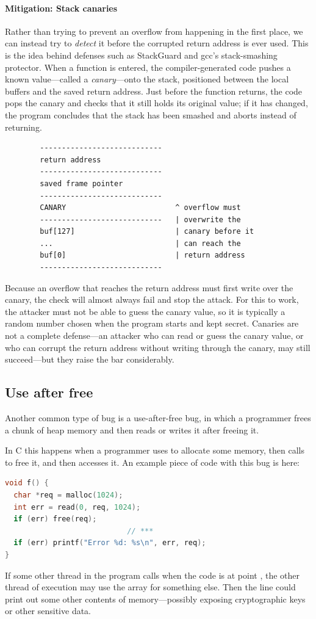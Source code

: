 \paragraph{Mitigation: Stack canaries}
Rather than trying to prevent an overflow from happening in the first
place, we can instead try to \emph{detect} it before the corrupted
return address is ever used. This is the idea behind defenses such as
StackGuard and gcc's stack-smashing protector. When a function is
entered, the compiler-generated code pushes a known value---called a
\emph{canary}---onto the stack, positioned between the local buffers and
the saved return address. Just before the function returns, the code
pops the canary and checks that it still holds its original value; if it
has changed, the program concludes that the stack has been smashed and
aborts instead of returning.
\begin{verbatim}
        ----------------------------
        return address
        ----------------------------
        saved frame pointer
        ----------------------------
        CANARY                         ^ overflow must
        ----------------------------   | overwrite the
        buf[127]                       | canary before it
        ...                            | can reach the
        buf[0]                         | return address
        ----------------------------
\end{verbatim}
Because an overflow that reaches the return address must first write over
the canary, the check will almost always fail and stop the attack. For
this to work, the attacker must not be able to guess the canary value, so
it is typically a random number chosen when the program starts and kept
secret. Canaries are not a complete defense---an attacker who can read or
guess the canary value, or who can corrupt the return address without
writing through the canary, may still succeed---but they raise the bar
considerably.

\subsection{Use after free}
Another common type of bug is a use-after-free bug,
in which a programmer frees a chunk of heap memory and then
reads or writes it after freeing it.

In C this happens when a programmer uses  to allocate
some memory, then calls  to free it, and then accesses it.
An example piece of code with this bug is here:
\begin{lstlisting}[language=c]
void f() {
  char *req = malloc(1024);
  int err = read(0, req, 1024);
  if (err) free(req);
                            // ***
  if (err) printf("Error %d: %s\n", err, req);
}
\end{lstlisting}
If some other thread in the program calls  when
the code is at point \ttt{***}, the other thread of execution
may use the array  for something else.
Then the  line could print out some other contents
of memory---possibly exposing cryptographic keys or other
sensitive data.


